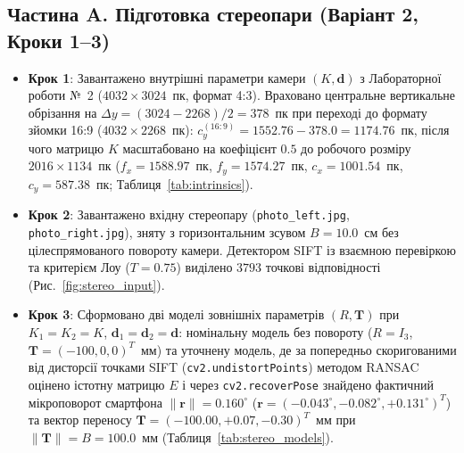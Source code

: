 \documentclass[14pt, a4paper]{extarticle}
\begin{document}
\subsection{Частина A. Підготовка стереопари (Варіант 2, Кроки 1--3)}
\begin{itemize}
    \item \textbf{Крок 1}: Завантажено внутрішні параметри камери $(K, \mathbf{d})$ з Лабораторної роботи №~2 ($4032 \times 3024$~пк, формат 4:3). Враховано центральне вертикальне обрізання на $\Delta y = (3024 - 2268)/2 = 378$~пк при переході до формату зйомки 16:9 ($4032 \times 2268$~пк): $c_y^{(16:9)} = 1552.76 - 378.0 = 1174.76$~пк, після чого матрицю $K$ масштабовано на коефіцієнт $0.5$ до робочого розміру $2016 \times 1134$~пк ($f_x = 1588.97$~пк, $f_y = 1574.27$~пк, $c_x = 1001.54$~пк, $c_y = 587.38$~пк; Таблиця~\ref{tab:intrinsics}).
    \item \textbf{Крок 2}: Завантажено вхідну стереопару (\texttt{photo\_left.jpg}, \texttt{photo\_right.jpg}), зняту з горизонтальним зсувом $B = 10.0$~см без цілеспрямованого повороту камери. Детектором SIFT із взаємною перевіркою та критерієм Лоу ($T = 0.75$) виділено $3793$ точкові відповідності (Рис.~\ref{fig:stereo_input}).
    \item \textbf{Крок 3}: Сформовано дві моделі зовнішніх параметрів $(R, \mathbf{T})$ при $K_1 = K_2 = K$, $\mathbf{d}_1 = \mathbf{d}_2 = \mathbf{d}$: номінальну модель без повороту ($R = I_3$, $\mathbf{T} = (-100, 0, 0)^T$~мм) та уточнену модель, де за попередньо скоригованими від дисторсії точками SIFT (\texttt{cv2.undistortPoints}) методом RANSAC оцінено істотну матрицю $E$ і через \texttt{cv2.recoverPose} знайдено фактичний мікроповорот смартфона $\|\mathbf{r}\| = 0.160^\circ$ ($\mathbf{r} = (-0.043^\circ, -0.082^\circ, +0.131^\circ)^T$) та вектор переносу $\mathbf{T} = (-100.00, +0.07, -0.30)^T$~мм при $\|\mathbf{T}\| = B = 100.0$~мм (Таблиця~\ref{tab:stereo_models}).
\end{itemize}
\end{document}
